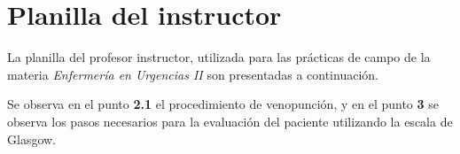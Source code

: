 \chapter{Planilla del instructor}

La planilla del profesor instructor, utilizada para las prácticas de campo de la
materia \emph{Enfermería en Urgencias II} son presentadas a continuación.

Se observa en el punto \textbf{2.1} el procedimiento de venopunción, y en el
punto \textbf{3} se observa los pasos necesarios para la evaluación del paciente
utilizando la escala de Glasgow.





